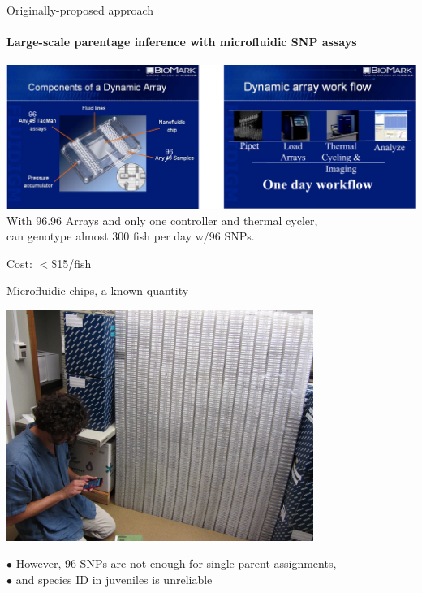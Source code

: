 \documentclass[letter,graphicx]{beamer}
\begin{document}
\begin{frame}{Originally-proposed approach}
\framesubtitle{Large-scale parentage inference with microfluidic SNP assays}
\begin{center}
\mbox{}\hspace*{-.10\textwidth}
\includegraphics[width=1.16\textwidth]{mhap_figs/fluidigm.png}\\
With 96.96 Arrays and only one controller and thermal cycler, \\
can genotype almost 300 fish per day w/96 SNPs.

Cost: $<$\$15/fish 
\end{center}
\end{frame}








\begin{frame}{Microfluidic chips, a known quantity}
\begin{center}
\includegraphics[width=0.75\textwidth]{mhap_figs/AC_calculating_chipwall.jpg}
\end{center}
$\bullet$ However, 96 SNPs are not enough for single parent assignments,\\
$\bullet$ and species ID in juveniles is unreliable
\end{frame}
\end{document}
